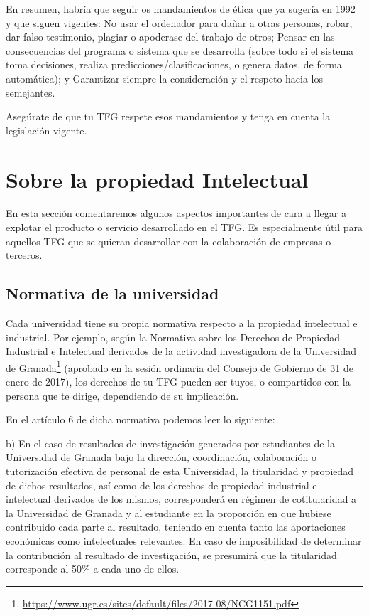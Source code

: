 {En resumen, habría que seguir os mandamientos de ética que ya sugería \cite{EticaUCM} en 1992 y que siguen vigentes: No usar el ordenador para dañar a otras personas, robar, dar falso testimonio, plagiar o apoderase del trabajo de otros; Pensar en las consecuencias del programa o sistema que se desarrolla (sobre todo si el sistema toma decisiones, realiza predicciones/clasificaciones, o genera datos, de forma automática); y Garantizar siempre la consideración y el respeto hacia los semejantes.

Asegúrate de que tu TFG respete esos mandamientos y tenga en cuenta la legislación vigente.

\section{Sobre la propiedad Intelectual} %

En esta sección comentaremos algunos aspectos importantes de cara a llegar a explotar el producto o servicio desarrollado en el TFG. Es especialmente útil para aquellos TFG que se quieran desarrollar con la colaboración de empresas o terceros.

\subsection{Normativa de la universidad}

Cada universidad tiene su propia normativa respecto a la propiedad intelectual e industrial. Por ejemplo, según la Normativa sobre los Derechos de Propiedad Industrial e Intelectual derivados de la actividad investigadora de la Universidad de Granada\footnote{\url{https://www.ugr.es/sites/default/files/2017-08/NCG1151.pdf}} (aprobado en la sesión ordinaria del Consejo de Gobierno de 31 de enero de 2017), los derechos de tu TFG pueden ser tuyos, o compartidos con la persona que te dirige, dependiendo de su implicación.

En el artículo 6 de dicha normativa podemos leer lo siguiente:

\begin{itemize}
\begin{it}
\item b) En el caso de resultados de investigación generados por estudiantes de
la Universidad de Granada bajo la dirección, coordinación, colaboración
o tutorización efectiva de personal de esta Universidad, la titularidad y
propiedad de dichos resultados, así como de los derechos de propiedad
industrial e intelectual derivados de los mismos, corresponderá en
régimen de cotitularidad a la Universidad de Granada y al estudiante en
la proporción en que hubiese contribuido cada parte al resultado,
teniendo en cuenta tanto las aportaciones económicas como
intelectuales relevantes. En caso de imposibilidad de determinar la
contribución al resultado de investigación, se presumirá que la
titularidad corresponde al 50\% a cada uno de ellos.


\end{it}
\end{itemize}}
